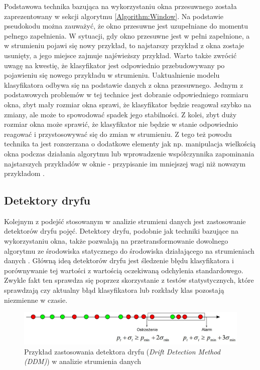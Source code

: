 \noindent Podstawowa technika bazująca na wykorzystaniu okna przesuwnego została zaprezentowany w sekcji algorytmu \ref{Algorithm:Window}. Na podstawie pseudokodu można zauważyć, że okno przesuwne jest uzupełniane do momentu pełnego zapełnienia. W sytuacji, gdy okno przesuwne jest w pełni zapełnione, a w strumieniu pojawi się nowy przykład, to najstarszy przykład z okna zostaje usunięty, a jego miejsce zajmuje najświeższy przykład. Warto także zwrócić uwagę na kwestię, że klasyfikator jest odpowiednio przebudowywany po pojawieniu się nowego przykładu w strumieniu. Uaktualnienie modelu klasyfikatora odbywa się na podstawie danych z okna przesuwnego. Jednym z podstawowych problemów w tej technice jest dobranie odpowiedniego rozmiaru okna, zbyt mały rozmiar okna sprawi, że klasyfikator będzie reagował szybko na zmiany, ale może to spowodować spadek jego stabilności. Z kolei, zbyt duży rozmiar okna może sprawić, że klasyfikator nie będzie w stanie odpowiednio reagować i przystosowywać się do zmian w strumieniu. Z tego też powodu technika ta jest rozszerzana o dodatkowe elementy jak np. manipulacja wielkością okna podczas działania algorytmu lub wprowadzenie współczynnika zapominania najstarszych przykładów w oknie - przypisanie im mniejszej wagi niż nowszym przykładom \cite{BrzezPhd2015}.

\subsection{Detektory dryfu}

\noindent Kolejnym z podejść stosowanym w analizie strumieni danych jest zastosowanie detektorów dryfu pojęć. Detektory dryfu, podobnie jak techniki bazujące na wykorzystaniu okna, także pozwalają na przetransformowanie dowolnego algorytmu ze środowiska statycznego do środowiska działającego na strumieniach danych \cite{Article:DriftGama2}. Główną ideą detektorów dryfu jest śledzenie błędu klasyfikatora i porównywanie tej wartości z wartością oczekiwaną odchylenia standardowego. Zwykle fakt ten sprawdza się poprzez skorzystanie z testów statystycznych, które sprawdzają czy aktualny błąd klasyfikatora lub rozkłady klas pozostają niezmienne w czasie.

\newpage

\begin{figure}[h] 
    \centering
    \includegraphics[width=15cm]{figures/drift_detection.JPG}
    \caption{Przykład zastosowania detektora dryfu (\textit{Drift Detection Method (DDM)}) w analizie strumienia danych \cite{Prezentacja:Strumienie}}\label{Figure:DriftDetection}
\end{figure}

